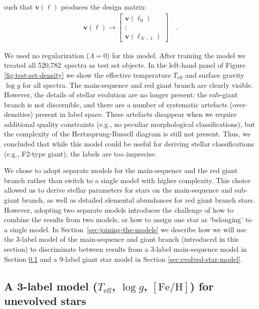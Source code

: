 \documentclass[preprint,trackchanges]{aastex}
\newcommand{\teff}{T_{\mathrm{eff}}}
\newcommand{\logg}{\log g}
\newcommand{\feh}{[\mathrm{Fe/H}]}
\newcommand{\Nspectra}{520,782}
\newcommand{\Dvector}[1]{\boldsymbol{#1}}
\newcommand{\vecv}{\Dvector{v}}
\begin{document}
\noindent{}such that $\vecv(\ell)$ produces the design matrix:
\begin{eqnarray}
	\vecv(\ell) \rightarrow \begin{bmatrix} \vecv(\ell_0) \\ \vdots \\ \vecv(\ell_{N-1}) \end{bmatrix} \quad .
\end{eqnarray}


We used no regularization ($\Lambda = 0$) for this model.  After training the model we
treated all \Nspectra\ spectra as test set objects.  In the left-hand panel of Figure 
\ref{fig:test-set-density} we show the effective temperature $\teff$ and surface gravity 
$\logg$ for all spectra.  The main-sequence and red giant branch are clearly visible.  
However, the details of stellar evolution are no longer present: the sub-giant branch is 
not discernible, and there are a number of systematic artefacts (over-densities) present
in label space.  These artefacts disappear when we require additional quality constraints 
(e.g., no peculiar morphological classifications), but the complexity of the 
Hertzsprung-Russell diagram is still not present.  Thus, we concluded that while this 
model could be useful for deriving stellar classifications (e.g., F2-type giant), the 
labels are too imprecise.


We chose to adopt separate models for the main-sequence and the red giant branch rather
than switch to a single model with higher complexity.  This choice allowed us to derive
stellar parameters for stars on the main-sequence and sub-giant branch, as well as 
detailed elemental abundances for red giant branch stars.  However, adopting two separate
models introduces the challenge of how to combine the results from two models, or how to
assign one star as `belonging' to a single model.  In Section~\ref{sec:joining-the-models}
we describe how we will use the 3-label model of the main-sequence and giant branch
(introduced in this section) to discriminate between results from a 3-label main-sequence 
model in Section \ref{sec:unevolved-star-model} and a 9-label giant star model in Section 
\ref{sec:evolved-star-model}.


\subsection{A 3-label model ($\teff$, $\logg$, $\feh$) for unevolved stars}
\label{sec:unevolved-star-model}
\end{document}
